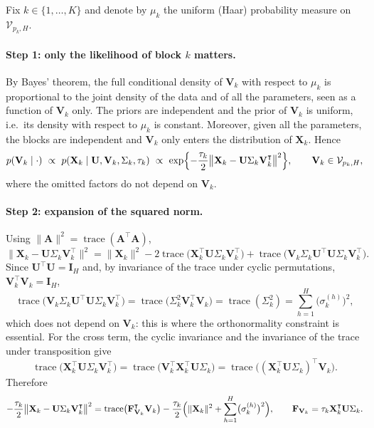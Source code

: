 \documentclass[11pt]{article}
\DeclareMathOperator{\trace}{trace}
\newcommand{\X}{\mathbf{X}}
\newcommand{\U}{\mathbf{U}}
\newcommand{\V}{\mathbf{V}}
\newcommand{\F}{\mathbf{F}}
\newcommand{\I}{\mathbf{I}}
\newcommand{\Stiefel}[2]{\mathcal V_{#1,#2}}
\begin{document}
Fix $k\in\{1,\ldots,K\}$ and denote by $\mu_k$ the uniform (Haar) probability measure on $\Stiefel{p_k}{H}$.

\paragraph{Step 1: only the likelihood of block $k$ matters.}
By Bayes' theorem, the full conditional density of $\V_k$ with respect to $\mu_k$ is proportional to the joint
density of the data and of all the parameters, seen as a function of $\V_k$ only. The priors are independent and the prior of $\V_k$ is uniform, i.e.\ its density with respect to $\mu_k$ is
constant. Moreover, given all the parameters, the blocks are independent and $\V_k$ only enters the distribution of
$\X_k$. Hence
\begin{equation}
  p(\V_k\mid\cdot)\ \propto\ p(\X_k\mid\U,\V_k,\Sigma_k,\tau_k)
  \ \propto\ \exp\Bigl\{-\frac{\tau_k}{2}\bigl\|\X_k-\U\Sigma_k\V_k^\intercal\bigr\|^2\Bigr\},
  \qquad \V_k\in\Stiefel{p_k}{H},
  \label{eq:step1}
\end{equation}
where the omitted factors do not depend on $\V_k$.

\paragraph{Step 2: expansion of the squared norm.}
Using $\|\mathbf A\|^2=\trace(\mathbf A^\intercal\mathbf A)$,
\[
  \bigl\|\X_k-\U\Sigma_k\V_k^\intercal\bigr\|^2
  =\|\X_k\|^2-2\trace\bigl(\X_k^\intercal\U\Sigma_k\V_k^\intercal\bigr)+\trace\bigl(\V_k\Sigma_k\U^\intercal\U\Sigma_k\V_k^\intercal\bigr).
\]
Since $\U^\intercal\U=\I_H$ and, by invariance of the trace under cyclic permutations, $\V_k^\intercal\V_k=\I_H$,
\[
  \trace\bigl(\V_k\Sigma_k\U^\intercal\U\Sigma_k\V_k^\intercal\bigr)=\trace\bigl(\Sigma_k^2\V_k^\intercal\V_k\bigr)=\trace(\Sigma_k^2)
  =\sum_{h=1}^H\bigl(\sigma_k^{(h)}\bigr)^2,
\]
which does not depend on $\V_k$: this is where the orthonormality constraint is essential. For the cross term, the
cyclic invariance and the invariance of the trace under transposition give
\[
  \trace\bigl(\X_k^\intercal\U\Sigma_k\V_k^\intercal\bigr)=\trace\bigl(\V_k^\intercal\X_k^\intercal\U\Sigma_k\bigr)
  =\trace\bigl((\X_k^\intercal\U\Sigma_k)^\intercal\V_k\bigr).
\]
Therefore
\begin{equation}
  -\frac{\tau_k}{2}\bigl\|\X_k-\U\Sigma_k\V_k^\intercal\bigr\|^2
  =\trace\bigl(\F_{\V_k}^\intercal\V_k\bigr)-\frac{\tau_k}{2}\Bigl(\|\X_k\|^2+\sum_{h=1}^H\bigl(\sigma_k^{(h)}\bigr)^2\Bigr),
  \qquad \F_{\V_k}=\tau_k\X_k^\intercal\U\Sigma_k .
  \label{eq:step2}
\end{equation}
\end{document}

